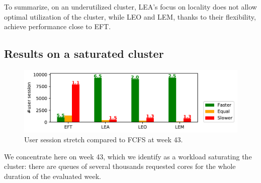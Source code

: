 \documentclass[conference]{IEEEtran}
\newcommand{\rev}[1]{{\color{black}{#1}}}
\begin{document}
To summarize, on an underutilized cluster, LEA's focus on locality
does not allow optimal utilization of the cluster, while LEO and LEM, thanks
to their flexibility, achieve performance close to EFT.


\subsection{Results on a saturated cluster}\label{sec.43}

\begin{figure}[t]\centering\includegraphics[width=1\linewidth]{../MBSS/plot/Boxplot/byuser/small_hist_stretch_10-24-10-30.pdf}\caption{User session stretch compared to FCFS at week 43.}\label{smallhist.43}\end{figure}

We concentrate here on week 43, which we identify as a workload saturating the cluster: there are queues of
several thousands requested cores for the whole duration of the evaluated week.

\end{document}
